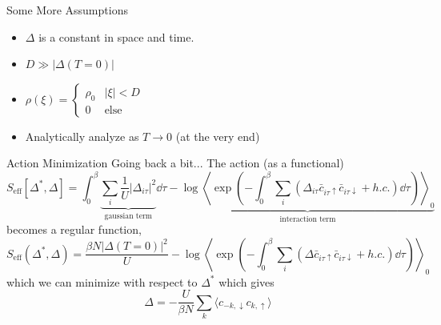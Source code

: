 \documentclass[aspectratio=169,xcolor=dvipsnames]{beamer}
\begin{document}
\begin{frame}{Some More Assumptions}
    \begin{itemize}
        \item $\Delta$ is a constant in space and time.
        \item $D \gg |\Delta(T=0)|$
        \item $\rho(\xi) = \begin{cases}
            \rho_0 & |\xi| < D \\ 
            0 & \text{else}
        \end{cases}$
        \item Analytically analyze as $T \to 0$ (at the very end)
    \end{itemize}
    \begin{center}
    \end{center}


\end{frame}
\begin{frame}{Action Minimization}
    Going back a bit... The action (as a functional)
    \begin{equation*}
        S_\text{eff}[\Delta^*,\Delta] = \int_0^\beta \underbrace{\sum_i \frac{1}{U}|\Delta_{i\tau}|^2}_{\text{gaussian term}} \dd{\tau} - \underbrace{\log \left\langle \exp\left(-\int_0^\beta \sum_i (\Delta_{i\tau}\bar{c}_{i\tau\uparrow}\bar{c}_{i\tau\downarrow} + h.c.) \dd{\tau}\right)\right\rangle_0}_{\text{interaction term}}
    \end{equation*}
    becomes a regular function,
    \begin{equation*}
        S_\text{eff}(\Delta^*,\Delta) =  \frac{\beta N |\Delta(T=0)|^2}{U} - \log \left\langle \exp\left(-\int_0^\beta \sum_i (\Delta \bar{c}_{i\tau\uparrow}\bar{c}_{i\tau\downarrow} + h.c.) \dd{\tau}\right)\right\rangle_0
    \end{equation*}
    which we can minimize with respect to $\Delta^*$ which gives
    \begin{equation*}
        \Delta = - \frac{U}{\beta N}\sum_k \langle c_{-k,\downarrow}c_{k,\uparrow}\rangle
    \end{equation*}
\end{frame}
\end{document}

